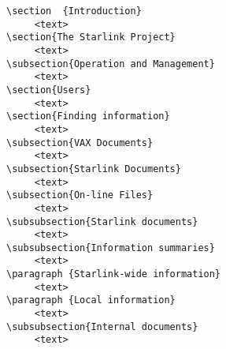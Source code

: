 \begin{verbatim}
\section  {Introduction}
     <text>
\section{The Starlink Project}
     <text>
\subsection{Operation and Management}
     <text>
\section{Users}
     <text>
\section{Finding information}
     <text>
\subsection{VAX Documents}
     <text>
\subsection{Starlink Documents}
     <text>
\subsection{On-line Files}
     <text>
\subsubsection{Starlink documents}
     <text>
\subsubsection{Information summaries}
     <text>
\paragraph {Starlink-wide information}
     <text>
\paragraph {Local information}
     <text>
\subsubsection{Internal documents}
     <text>

\end{verbatim}
